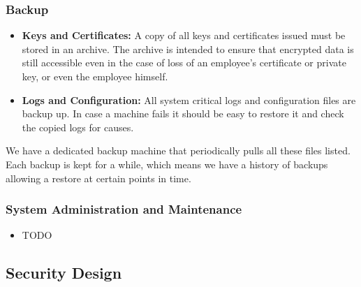 \documentclass[english]{article}
\begin{document}
\subsubsection{Backup}
\begin{itemize}
\item \textbf{Keys and Certificates:} A copy of all keys and certificates issued must be stored in an archive. The archive is intended to ensure that encrypted data is still accessible even in the
case of loss of an employee’s certificate or private key, or even the employee
himself.
\item \textbf{Logs and Configuration:} All system critical logs and configuration files are backup up. In case a machine fails it should be easy to restore it and check the copied logs for causes.
\end{itemize}

We have a dedicated backup machine that periodically pulls all these files listed. Each backup is kept for a while, which means we have a history of backups allowing a restore at certain points in time. 

\subsubsection{System Administration and Maintenance}
\begin{itemize}
\item TODO
\end{itemize}

\subsection{Security Design}
\end{document}
